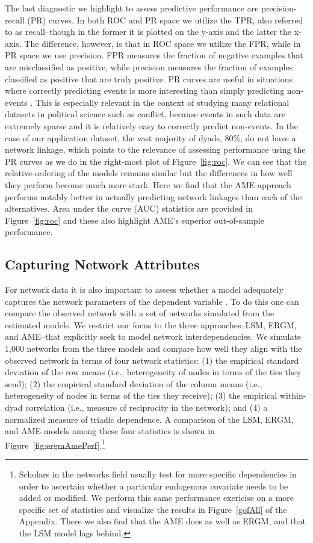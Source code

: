 \documentclass[12pt,pdflatex]{elsarticle}
\begin{document}
The last diagnostic we highlight to assess predictive performance are precision-recall (PR) curves. In both ROC and PR space we utilize the TPR, also referred to as recall--though in the former it is plotted on the y-axis and the latter the x-axis. The difference, however, is that in ROC space we utilize the FPR, while in PR space we use precision. FPR measures the fraction of negative examples that are misclassified as positive, while precision measures the fraction of examples classified as positive that are truly positive. PR curves are useful in situations where correctly predicting events is more interesting than simply predicting non-events \citep{davis:goadrich:2006}. This is especially relevant in the context of studying many relational datasets in political science such as conflict, because events in such data are extremely sparse and it is relatively easy to correctly predict non-events. In the case of our application dataset, the vast majority of dyads, 80\%, do not have a network linkage, which points to the relevance of assessing performance using the PR curves as we do in the right-most plot of Figure~\ref{fig:roc}. We can see that the relative-ordering of the models remains similar but the differences in how well they perform become much more stark. Here we find that the AME approach performs notably better in actually predicting network linkages than each of the alternatives. Area under the curve (AUC) statistics are provided in Figure~\ref{fig:roc} and these also highlight AME's superior out-of-sample performance.

\subsection{Capturing Network Attributes}

For network data it is also important to assess whether a model adequately captures the network parameters of the dependent variable \citep{hunter:etal:2008}. To do this one can compare the observed network with a set of networks simulated from the estimated models. We restrict our focus to the three approaches--LSM, ERGM, and AME--that explicitly seek to model network interdependencies. We simulate 1,000 networks from the three models and compare how well they align with the observed network in terms of four network statistics: (1) the empirical standard deviation of the row means (i.e., heterogeneity of nodes in terms of the ties they send); (2) the empirical standard deviation of the column means (i.e., heterogeneity of nodes in terms of the ties they receive); (3) the empirical within-dyad correlation (i.e., measure of reciprocity in the network); and (4) a normalized measure of triadic dependence. A comparison of the LSM, ERGM, and AME models among these four statistics is shown in Figure~\ref{fig:ergmAmePerf}.\footnote{Scholars in the networks field usually test for more specific dependencies in order to ascertain whether a particular endogenous covariate needs to be added or modified. We perform this same performance exericise on a more specific set of statistics and visualize the results in Figure~\ref{gofAll} of the Appendix. There we also find that the AME does as well as ERGM, and that the LSM model lags behind.}
\end{document}
